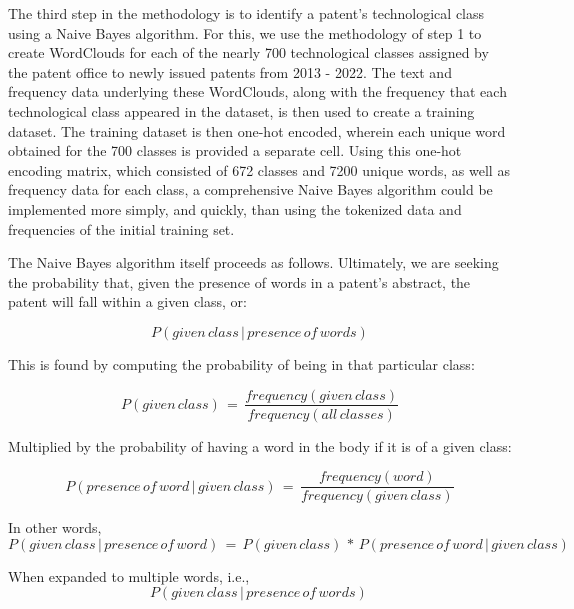 \documentclass{article}
\begin{document}
The third step in the methodology is to identify a patent’s technological class using a Naive Bayes algorithm.  For this, we use the methodology of step 1 to create WordClouds for each of the nearly 700 technological classes assigned by the patent office to newly issued patents from 2013 - 2022.  The text and frequency data underlying these WordClouds, along with the frequency that each technological class appeared in the dataset, is then used to create a training dataset.  The training dataset is then one-hot encoded, wherein each unique word obtained for the 700 classes is provided a separate cell.  Using this one-hot encoding matrix, which consisted of 672 classes and 7200 unique words, as well as frequency data for each class, a comprehensive Naive Bayes algorithm could be implemented more simply, and quickly, than using the tokenized data and frequencies of the initial training set.

The Naive Bayes algorithm itself proceeds as follows.  Ultimately, we are seeking the probability that, given the presence of words in a patent’s abstract, the patent will fall within a given class, or:

\begin{equation}
P(given\, class\, |\, presence\, of\, words)
\end{equation}

This is found by computing the probability of being in that particular class:

\begin{equation}
P(given\, class)\, =\,  \frac{frequency(given\, class)}{frequency(all\, classes)}
\end{equation}


Multiplied by the probability of having a word in the body if it is of a given class:

\begin{equation}
P(presence\, of\, word\, |\, given\, class)\, =\, \frac{frequency(word)}{frequency(given\, class)}
\end{equation}


In other words,
\begin{equation}
P(given\, class\, |\, presence\, of\, word)\, =\, P(given\, class)\, *\, P(presence\, of\, word\, |\, given\, class)
\end{equation}

When expanded to multiple words, i.e.,
\begin{equation}
P(given\, class\, |\, presence\, of\, words)\, 
\end{equation}
\end{document}
